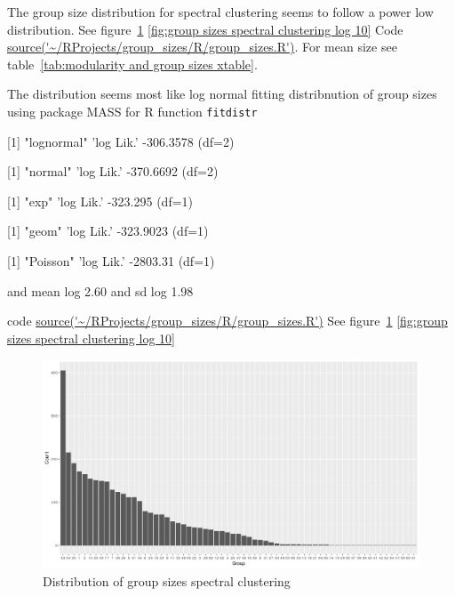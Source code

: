 The group size distribution for spectral clustering seems to follow a power low distribution. See figure~\ref{fig:group sizes spectral clustering shows power law distribution} \ref{fig:group sizes spectral clustering log 10} Code \url{source('~/RProjects/group_sizes/R/group_sizes.R')}. For mean size see table~\ref{tab:modularity and group sizes xtable}. 

The distribution seems most like log normal fitting distribnution of group sizes using package MASS for R function \texttt{fitdistr}

[1] "lognormal"
'log Lik.' -306.3578 (df=2)

[1] "normal" 
'log Lik.' -370.6692 (df=2)

[1] "exp"
'log Lik.' -323.295 (df=1)

[1] "geom"
'log Lik.' -323.9023 (df=1)

[1] "Poisson"
'log Lik.' -2803.31 (df=1)



and mean log 2.60 and sd log 1.98

code \url{source('~/RProjects/group_sizes/R/group_sizes.R')}
See figure~\ref{fig:group sizes spectral clustering shows power law distribution} \ref{fig:group sizes spectral clustering log 10}
\begin{figure}
    \centering
    \includegraphics[width=\textwidth]{images/Rplot_group_size_spectral.png}
    \caption{Distribution of group sizes spectral clustering}
    \label{fig:group sizes spectral clustering shows power law distribution}
\end{figure}

